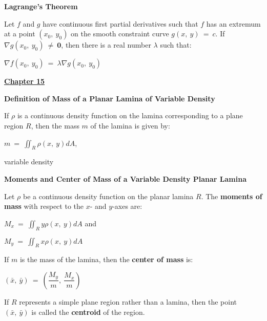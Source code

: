 \documentclass{article}
\begin{document}
\begin{large}
\textbf{Lagrange's Theorem}

\hspace{0.1in} Let $f$ and $g$ have continuous first partial derivatives such that $f$ has an extremum at a point $(x_{0},\ y_{0})$ on the smooth constraint curve $g(x,\ y)\ =\ c$.  If $\nabla g(x_{0},\ y_{0})\ \neq\ \textbf{0}$, then there is a real number $\lambda$ such that:

\hspace{2.0in} $\nabla f(x_{0},\ y_{0})\ =\ \lambda\nabla g(x_{0},\ y_{0})$

\vspace{0.25in}

\underline{\textbf{\huge Chapter 15 \phantom{ } \phantom{ } \phantom{ } \phantom{ }}}

\textbf{Definition of Mass of a Planar Lamina of Variable Density}

\hspace{0.1in} If $\rho$ is a continuous density function on the lamina corresponding to a plane region $R$, then the mass $m$ of the lamina is given by:

\hspace{2.0in} $m\ =\ \displaystyle\iint_{R}\rho(x,\ y)dA$, \begin{Large} variable density \end{Large}

\vspace{0.5in}
\textbf{Moments and Center of Mass of a Variable Density Planar Lamina}

\hspace{0.1in} Let $\rho$ be a continuous density function on the planar lamina $R$. The \textbf{moments of mass} with respect to the $x$- and $y$-axes are:

\hspace{2.5in} $M_{x}\ =\ \displaystyle\iint_{R}y\rho(x,\ y)dA$ and

\hspace{2.5in} $M_{y}\ =\ \displaystyle\iint_{R}x\rho(x,\ y)dA$

\hspace{0.1in} If $m$ is the mass of the lamina, then the \textbf{center of mass} is:

\hspace{2.5in} $(\bar{x},\ \bar{y})\ =\ \left(\dfrac{M_{y}}{m},\ \dfrac{M_{x}}{m}\right)$

\hspace{0.1in} If $R$ represents a simple plane region rather than a lamina, then the point $(\bar{x},\ \bar{y})$ is called the \textbf{centroid} of the region.


\end{large}
\end{document}
